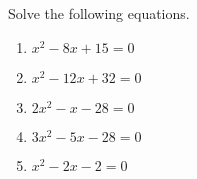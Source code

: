 \documentclass{article}
\begin{document}
\HomeworkTitle[class={College Algebra}, number={2}, name={Quadratic Equations}]

Solve the following equations.

\begin{enumerate}
\item $x^2 - 8x + 15 = 0$

   \vspace{4cm}

\item $x^2 - 12x + 32 = 0$

   \vspace{4cm}

\item $2x^2 - x - 28 = 0$

   \vspace{4cm}

\item $3x^2 - 5x - 28 = 0$

   \vspace{4cm}

\item 

$x^2 - 2x - 2 = 0$

  
\end{enumerate}
\end{document}
